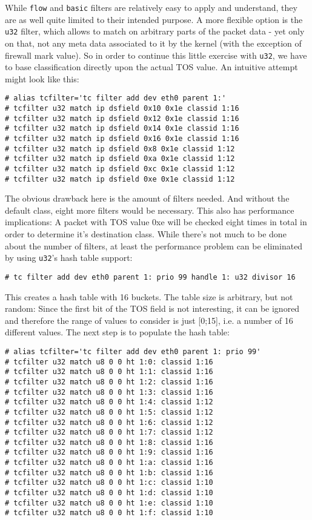 \documentclass[12pt,twoside]{article}
\newcommand{\filter}{\texttt}
\begin{document}
While \filter{flow} and \filter{basic} filters are relatively easy to apply and understand, they
are as well quite limited to their intended purpose. A more flexible option is
the \filter{u32} filter, which allows to match on arbitrary parts of the packet data -
yet only on that, not any meta data associated to it by the kernel (with the
exception of firewall mark value). So in order to continue this little
exercise with \filter{u32}, we have to base classification directly upon the actual TOS
value. An intuitive attempt might look like this:
\begin{Verbatim}
# alias tcfilter='tc filter add dev eth0 parent 1:'
# tcfilter u32 match ip dsfield 0x10 0x1e classid 1:16
# tcfilter u32 match ip dsfield 0x12 0x1e classid 1:16
# tcfilter u32 match ip dsfield 0x14 0x1e classid 1:16
# tcfilter u32 match ip dsfield 0x16 0x1e classid 1:16
# tcfilter u32 match ip dsfield 0x8 0x1e classid 1:12
# tcfilter u32 match ip dsfield 0xa 0x1e classid 1:12
# tcfilter u32 match ip dsfield 0xc 0x1e classid 1:12
# tcfilter u32 match ip dsfield 0xe 0x1e classid 1:12
\end{Verbatim}
The obvious drawback here is the amount of filters needed. And without the
default class, eight more filters would be necessary. This also has performance
implications: A packet with TOS value 0xe will be checked eight times in total
in order to determine it's destination class. While there's not much to be done
about the number of filters, at least the performance problem can be eliminated
by using \filter{u32}'s hash table support:
\begin{Verbatim}
# tc filter add dev eth0 parent 1: prio 99 handle 1: u32 divisor 16
\end{Verbatim}
This creates a hash table with 16 buckets. The table size is arbitrary, but not
random: Since the first bit of the TOS field is not interesting, it can be
ignored and therefore the range of values to consider is just [0;15], i.e. a
number of 16 different values. The next step is to populate the hash table:
\begin{Verbatim}
# alias tcfilter='tc filter add dev eth0 parent 1: prio 99'
# tcfilter u32 match u8 0 0 ht 1:0: classid 1:16
# tcfilter u32 match u8 0 0 ht 1:1: classid 1:16
# tcfilter u32 match u8 0 0 ht 1:2: classid 1:16
# tcfilter u32 match u8 0 0 ht 1:3: classid 1:16
# tcfilter u32 match u8 0 0 ht 1:4: classid 1:12
# tcfilter u32 match u8 0 0 ht 1:5: classid 1:12
# tcfilter u32 match u8 0 0 ht 1:6: classid 1:12
# tcfilter u32 match u8 0 0 ht 1:7: classid 1:12
# tcfilter u32 match u8 0 0 ht 1:8: classid 1:16
# tcfilter u32 match u8 0 0 ht 1:9: classid 1:16
# tcfilter u32 match u8 0 0 ht 1:a: classid 1:16
# tcfilter u32 match u8 0 0 ht 1:b: classid 1:16
# tcfilter u32 match u8 0 0 ht 1:c: classid 1:10
# tcfilter u32 match u8 0 0 ht 1:d: classid 1:10
# tcfilter u32 match u8 0 0 ht 1:e: classid 1:10
# tcfilter u32 match u8 0 0 ht 1:f: classid 1:10
\end{Verbatim}
\end{document}
